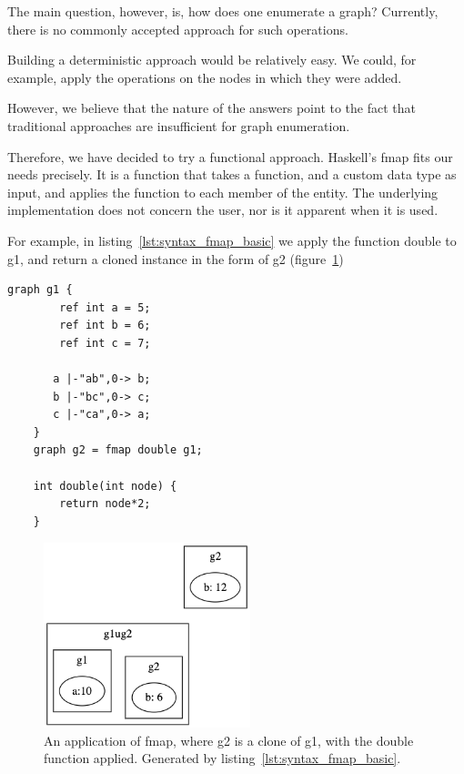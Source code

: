 The main question, however, is, how does one enumerate a graph?
Currently, there is no commonly accepted approach
for such operations.

Building a deterministic approach would be relatively easy.
We could, for example, apply the operations on the nodes in which
they were added.

However, we believe that the nature of the answers point to the fact that traditional approaches are insufficient for graph
enumeration.

Therefore, we have decided to try a functional approach.
Haskell's fmap fits our needs precisely.
It is a function that takes a function, and a custom data type as input, and applies the function to each member of
the entity.
The underlying implementation does not concern the user, nor is it apparent when it is used.

For example, in listing~\ref{lst:syntax_fmap_basic} we apply the function double to g1, and return a cloned instance
in the form of g2 (figure~\ref{fig:syntax_fmap_basic})

\begin{lstlisting}[caption={Simple fmap application on a graph.},captionpos=b,label={lst:syntax_fmap_basic}]
    graph g1 {
        ref int a = 5;
        ref int b = 6;
        ref int c = 7;

       a |-"ab",0-> b;
       b |-"bc",0-> c;
       c |-"ca",0-> a;
    }
    graph g2 = fmap double g1;

    int double(int node) {
        return node*2;
    }
\end{lstlisting}

\begin{figure}[H]
    \centering
    \includegraphics[width=6cm]{figures/syntax_section/syntax_ref_vs_clone_graphs}
    \caption{An application of fmap, where g2 is a clone of g1, with the double function applied. Generated by listing~\ref{lst:syntax_fmap_basic}.}
    \label{fig:syntax_fmap_basic}
\end{figure}


